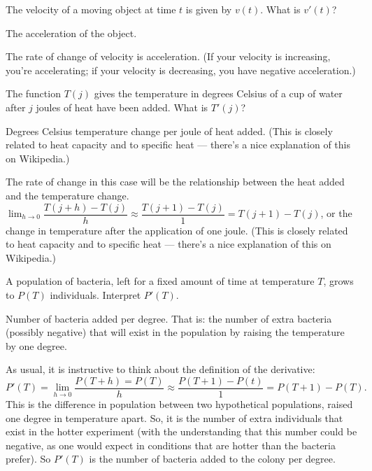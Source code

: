 \begin{Mquestion}The velocity of a moving object at time $t$ is given by $v(t)$. What is $v'(t)$?
\end{Mquestion}
\begin{answer} The acceleration of the object.
\end{answer}
\begin{solution} The rate of change of velocity is acceleration. (If your velocity is increasing, you're accelerating; if your velocity is decreasing, you have negative acceleration.)
\end{solution}


\begin{Mquestion}
The function $T(j)$ gives the temperature in degrees Celsius of a cup of water after $j$ joules of heat have been added. What is $T'(j)$?
\end{Mquestion}
\begin{answer} Degrees Celsius temperature change per joule of heat added.
(This is closely related to heat capacity and to
         specific heat --- there's a nice explanation of this on Wikipedia.)
\end{answer}
\begin{solution}
The rate of change in this case will be the relationship between the heat added and the temperature change. $\displaystyle\lim_{h \rightarrow 0} \dfrac{T(j+h)-T(j)}{h} \approx \dfrac{T(j+1)-T(j)}{1}=T(j+1)-T(j)$, or the change in temperature after the application of one joule. (This is closely related to heat capacity and to
         specific heat --- there's a nice explanation of this on Wikipedia.)
\end{solution}


\begin{Mquestion}\label{s2.3bacteria}A population of bacteria, left for a fixed amount of time at temperature $T$, grows to $P(T)$ individuals. Interpret $P'(T)$.
\end{Mquestion}
\begin{answer} Number of bacteria added per degree. That is: the number of extra bacteria (possibly negative) that will exist in the population by raising the temperature by one degree.
\end{answer}
\begin{solution} As usual, it is instructive to think about the definition of the derivative:
\[P'(T) = \displaystyle\lim_{h \rightarrow 0}\dfrac{P(T+h)=P(T)}{h} \approx \dfrac{P(T+1)-P(t)}{1} = P(T+1)-P(T).\] This is the difference in population between two hypothetical populations, raised one degree in temperature apart. So, it is the number of extra individuals that exist in the hotter experiment (with the understanding that this number could be negative, as one would expect in conditions that are hotter than the bacteria prefer). So $P'(T)$ is the number of bacteria added to the colony per degree.
\end{solution}

